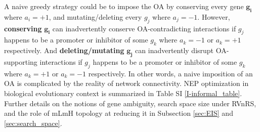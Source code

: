     A naive greedy strategy could be to impose the OA by conserving every gene $\boldsymbol{g_i}$ where $a_i = +1$, and mutating/deleting every $g_j$ where $a_j=-1$. However, \textbf{conserving} $\boldsymbol{g_i}$ can inadvertently conserve OA-contradicting interactions if $g_j$ happens to be a promoter or inhibitor of some $g_k$ where $a_k=-1$ or $a_k=+1$ respectively. And \textbf{deleting/mutating} $\boldsymbol{g_j}$ can inadvertently disrupt OA-supporting interactions if $g_j$ happens to be a promoter or inhibitor of some $g_k$ where $a_k=+1$ or $a_k=-1$ respectively. In other words, a naive imposition of an OA is complicated by the reality of network connectivity. NEP optimization in biological evolutionary context is summarized in Table SI \ref{I-informal_table}. Further details on the notions of gene ambiguity, search space size under RVnRS, and the role of mLmH topology at reducing it in Subsection \ref{sec:EIS} and \ref{sec:search_space}.
